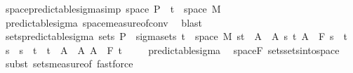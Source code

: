 \begin{isabellebody}
\isanewline
{}\isamarkupfalse%
\ space{\isacharunderscore}{\kern0pt}predictable{\isacharunderscore}{\kern0pt}sigma{\isacharbrackleft}{\kern0pt}simp{\isacharbrackright}{\kern0pt}{\isacharcolon}{\kern0pt}\ {\isachardoublequoteopen}space\ {\isasymSigma}\isactrlsub P\ {\isacharequal}{\kern0pt}\ {\isacharparenleft}{\kern0pt}{\isacharbraceleft}{\kern0pt}t\ {\isasymtimes}\ space\ M{\isacharparenright}{\kern0pt}{\isachardoublequoteclose}%
\isadelimproof
\ %
\endisadelimproof
%
\isatagproof
{}\isamarkupfalse%
\ predictable{\isacharunderscore}{\kern0pt}sigma\ space{\isacharunderscore}{\kern0pt}measure{\isacharunderscore}{\kern0pt}of{\isacharunderscore}{\kern0pt}conv\ \isamarkupfalse%
\ blast%
\endisatagproof
{\isafoldproof}%
%
\isadelimproof
%
\endisadelimproof
\isanewline
\isanewline
{}\isamarkupfalse%
\ sets{\isacharunderscore}{\kern0pt}predictable{\isacharunderscore}{\kern0pt}sigma{\isacharcolon}{\kern0pt}\ {\isachardoublequoteopen}sets\ {\isasymSigma}\isactrlsub P\ {\isacharequal}{\kern0pt}\ sigma{\isacharunderscore}{\kern0pt}sets\ {\isacharparenleft}{\kern0pt}{\isacharbraceleft}{\kern0pt}t\ {\isasymtimes}\ space\ M{\isacharparenright}{\kern0pt}\ {\isacharparenleft}{\kern0pt}{\isacharbraceleft}{\kern0pt}{\isacharbraceleft}{\kern0pt}s{\isacharless}{\kern0pt}{\isachardot}{\kern0pt}{\isachardot}{\kern0pt}t{\isacharbraceright}{\kern0pt}\ {\isasymtimes}\ A\ {\isacharbar}{\kern0pt}\ A\ s\ t{\isachardot}{\kern0pt}\ A\ {\isasymin}\ F\ s\ {\isasymand}\ t\ {\isasymle}\ s\ {\isasymand}\ s\ {\isacharless}{\kern0pt}\ t{\isacharbraceright}{\kern0pt}\ {\isasymunion}\ {\isacharbraceleft}{\kern0pt}{\isacharbraceleft}{\kern0pt}t\ {\isasymtimes}\ A\ {\isacharbar}{\kern0pt}\ A{\isachardot}{\kern0pt}\ A\ {\isasymin}\ F\ t\ \isanewline
%
\isadelimproof
\ \ %
\endisadelimproof
%
\isatagproof
{}\isamarkupfalse%
\ predictable{\isacharunderscore}{\kern0pt}sigma\ \isamarkupfalse%
\ space{\isacharunderscore}{\kern0pt}F\ sets{\isachardot}{\kern0pt}sets{\isacharunderscore}{\kern0pt}into{\isacharunderscore}{\kern0pt}space\ \isamarkupfalse%
\ {\isacharparenleft}{\kern0pt}subst\ sets{\isacharunderscore}{\kern0pt}measure{\isacharunderscore}{\kern0pt}of{\isacharparenright}{\kern0pt}\ fastforce{\isacharplus}{\kern0pt}%

\end{isabellebody}
